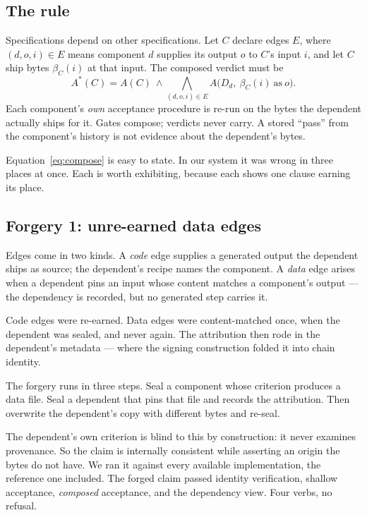 \documentclass[10pt,twocolumn,letterpaper]{article}
\begin{document}
\subsection{The rule}
Specifications depend on other specifications. Let $C$ declare edges $E$, where $(d,o,i)\in E$ means component $d$ supplies its output $o$ to $C$'s input $i$, and let $C$ ship bytes $\beta_C(i)$ at that input. The composed verdict must be
\begin{equation}
A^\ast(C)=A(C)\ \wedge\!\!\bigwedge_{(d,o,i)\in E}\! A\big(D_d,\ \beta_C(i)\ \text{as}\ o\big).
\label{eq:compose}
\end{equation}
Each component's \emph{own} acceptance procedure is re-run on the bytes the dependent actually ships for it. Gates compose; verdicts never carry. A stored ``pass'' from the component's history is not evidence about the dependent's bytes.

Equation~\ref{eq:compose} is easy to state. In our system it was wrong in three places at once. Each is worth exhibiting, because each shows one clause earning its place.

\subsection{Forgery 1: unre-earned data edges}
Edges come in two kinds. A \emph{code} edge supplies a generated output the dependent ships as source; the dependent's recipe names the component. A \emph{data} edge arises when a dependent pins an input whose content matches a component's output --- the dependency is recorded, but no generated step carries it.

Code edges were re-earned. Data edges were content-matched once, when the dependent was sealed, and never again. The attribution then rode in the dependent's metadata --- where the signing construction folded it into chain identity.

The forgery runs in three steps. Seal a component whose criterion produces a data file. Seal a dependent that pins that file and records the attribution. Then overwrite the dependent's copy with different bytes and re-seal.

The dependent's own criterion is blind to this by construction: it never examines provenance. So the claim is internally consistent while asserting an origin the bytes do not have. We ran it against every available implementation, the reference one included. The forged claim passed identity verification, shallow acceptance, \emph{composed} acceptance, and the dependency view. Four verbs, no refusal.
\end{document}
